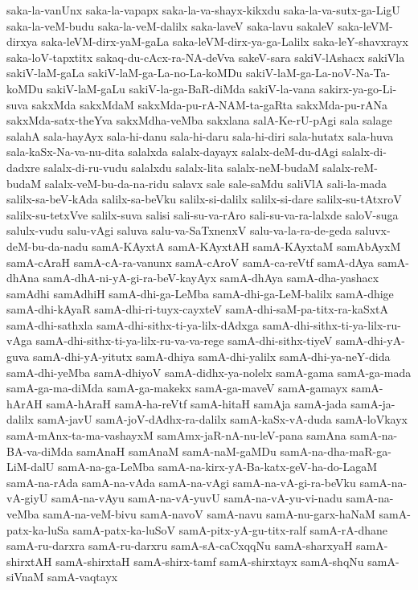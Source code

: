 {saka-la-vanUnx
saka-la-vapapx
saka-la-va-shayx-kikxdu
saka-la-va-sutx-ga-LigU
saka-la-veM-budu
saka-la-veM-dalilx
saka-laveV
saka-lavu
sakaleV
saka-leVM-dirxya
saka-leVM-dirx-yaM-gaLa
saka-leVM-dirx-ya-ga-Lalilx
saka-leY-shavxrayx
saka-loV-tapxtitx
sakaq-du-cAcx-ra-NA-deVva
sakeV-sara
sakiV-lAshacx
sakiVla
sakiV-laM-gaLa
sakiV-laM-ga-La-no-La-koMDu
sakiV-laM-ga-La-noV-Na-Ta-koMDu
sakiV-laM-gaLu
sakiV-la-ga-BaR-diMda
sakiV-la-vana
sakirx-ya-go-Li-suva
sakxMda
sakxMdaM
sakxMda-pu-rA-NAM-ta-gaRta
sakxMda-pu-rANa
sakxMda-satx-theYva
sakxMdha-veMba
sakxlana
salA-Ke-rU-pAgi
sala
salage
salahA
sala-hayAyx
sala-hi-danu
sala-hi-daru
sala-hi-diri
sala-hutatx
sala-huva
sala-kaSx-Na-va-nu-dita
salalxda
salalx-dayayx
salalx-deM-du-dAgi
salalx-di-dadxre
salalx-di-ru-vudu
salalxdu
salalx-lita
salalx-neM-budaM
salalx-reM-budaM
salalx-veM-bu-da-na-ridu
salavx
sale
sale-saMdu
saliVlA
sali-la-mada
salilx-sa-beV-kAda
salilx-sa-beVku
salilx-si-dalilx
salilx-si-dare
salilx-su-tAtxroV
salilx-su-tetxVve
salilx-suva
salisi
sali-su-va-rAro
sali-su-va-ra-lalxde
saloV-suga
salulx-vudu
salu-vAgi
saluva
salu-va-SaTxnenxV
salu-va-la-ra-de-geda
saluvx-deM-bu-da-nadu
samA-KAyxtA
samA-KAyxtAH
samA-KAyxtaM
samAbAyxM
samA-cAraH
samA-cA-ra-vanunx
samA-cAroV
samA-ca-reVtf
samA-dAya
samA-dhAna
samA-dhA-ni-yA-gi-ra-beV-kayAyx
samA-dhAya
samA-dha-yashacx
samAdhi
samAdhiH
samA-dhi-ga-LeMba
samA-dhi-ga-LeM-balilx
samA-dhige
samA-dhi-kAyaR
samA-dhi-ri-tuyx-cayxteV
samA-dhi-saM-pa-titx-ra-kaSxtA
samA-dhi-sathxla
samA-dhi-sithx-ti-ya-lilx-dAdxga
samA-dhi-sithx-ti-ya-lilx-ru-vAga
samA-dhi-sithx-ti-ya-lilx-ru-va-va-rege
samA-dhi-sithx-tiyeV
samA-dhi-yA-guva
samA-dhi-yA-yitutx
samA-dhiya
samA-dhi-yalilx
samA-dhi-ya-neY-dida
samA-dhi-yeMba
samA-dhiyoV
samA-didhx-ya-nolelx
samA-gama
samA-ga-mada
samA-ga-ma-diMda
samA-ga-makekx
samA-ga-maveV
samA-gamayx
samA-hArAH
samA-hAraH
samA-ha-reVtf
samA-hitaH
samAja
samA-jada
samA-ja-dalilx
samA-javU
samA-joV-dAdhx-ra-dalilx
samA-kaSx-vA-duda
samA-loVkayx
samA-mAnx-ta-ma-vashayxM
samAmx-jaR-nA-nu-leV-pana
samAna
samA-na-BA-va-diMda
samAnaH
samAnaM
samA-naM-gaMDu
samA-na-dha-maR-ga-LiM-dalU
samA-na-ga-LeMba
samA-na-kirx-yA-Ba-katx-geV-ha-do-LagaM
samA-na-rAda
samA-na-vAda
samA-na-vAgi
samA-na-vA-gi-ra-beVku
samA-na-vA-giyU
samA-na-vAyu
samA-na-vA-yuvU
samA-na-vA-yu-vi-nadu
samA-na-veMba
samA-na-veM-bivu
samA-navoV
samA-navu
samA-nu-garx-haNaM
samA-patx-ka-luSa
samA-patx-ka-luSoV
samA-pitx-yA-gu-titx-ralf
samA-rA-dhane
samA-ru-darxra
samA-ru-darxru
samA-sA-caCxqqNu
samA-sharxyaH
samA-shirxtAH
samA-shirxtaH
samA-shirx-tamf
samA-shirxtayx
samA-shqNu
samA-siVnaM
samA-vaqtayx
}
